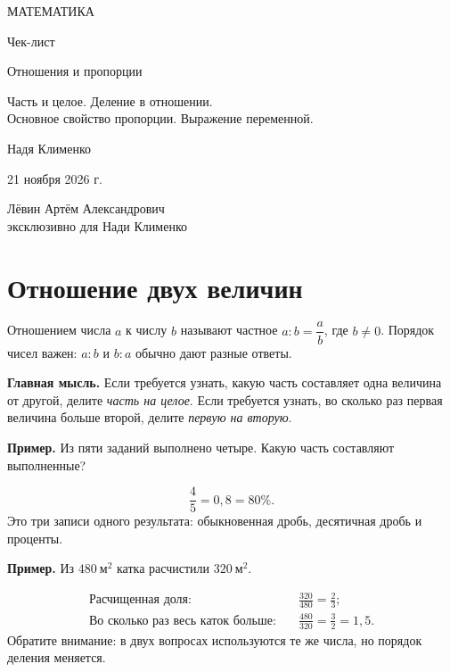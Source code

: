 \documentclass[a4paper,12pt]{article}
\newcommand{\keyidea}[1]{\textcolor{darkaccent}{\textbf{Главная мысль.}} #1}
\newcommand{\example}[1]{\par\medskip\textcolor{darkaccent}{\textbf{Пример.}} #1\par}
\begin{document}

\thispagestyle{empty}
\begin{center}
\vspace*{23mm}
{\color{darkaccent}\Large МАТЕМАТИКА\par}
\vspace{24mm}
{\LARGE Чек-лист\par}
\vspace{14mm}
{\color{accent}\LARGE Отношения и пропорции\par}
\vspace{13mm}
{\large Часть и целое. Деление в отношении.\\
Основное свойство пропорции. Выражение переменной.\par}
\vfill
{\large Надя Клименко\par}
\vspace{14mm}
{21 ноября 2026 г.\par}
\vspace{24mm}
{\small Лёвин Артём Александрович\\
эксклюзивно для Нади Клименко\par}
\vspace{18mm}
\end{center}
\clearpage
{}

\section{Отношение двух величин}
Отношением числа $a$ к числу $b$ называют частное $a:b=\dfrac ab$, где $b\ne0$.
Порядок чисел важен: $a:b$ и $b:a$ обычно дают разные ответы.

\keyidea{Если требуется узнать, какую часть составляет одна величина от другой,
делите \emph{часть на целое}. Если требуется узнать, во сколько раз первая величина
больше второй, делите \emph{первую на вторую}.}

\example{Из пяти заданий выполнено четыре. Какую часть составляют выполненные?}
\[
\frac{4}{5}=0{,}8=80\%.
\]
Это три записи одного результата: обыкновенная дробь, десятичная дробь и проценты.

\example{Из $480\ \text{м}^2$ катка расчистили $320\ \text{м}^2$.}
\begin{align*}
\text{Расчищенная доля:}\quad &\frac{320}{480}=\frac23;\\
\text{Во сколько раз весь каток больше:}\quad &\frac{480}{320}=\frac32=1{,}5.
\end{align*}
Обратите внимание: в двух вопросах используются те же числа, но порядок деления меняется.
\end{document}
